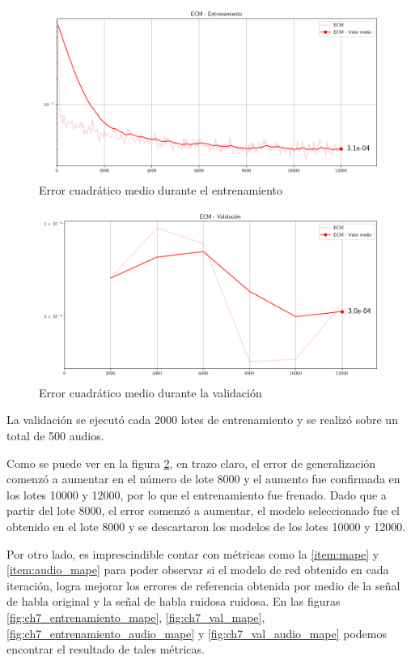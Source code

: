 \begin{figure}
	\centering
	\centerline{\includegraphics[scale=0.65]{images/ch7/entrenamiento/train_mse.png}}
	\caption{Error cuadrático medio durante el entrenamiento}
	\label{fig:ch7_entrenamiento_mse}
\end{figure}

\begin{figure}
	\centering
	\centerline{\includegraphics[scale=0.65]{images/ch7/entrenamiento/val_mse.png}}
	\caption{Error cuadrático medio durante la validación}
	\label{fig:ch7_validacion_mse}
\end{figure}

La validación se ejecutó cada 2000 lotes de entrenamiento y se realizó sobre un total de 500 audios.

Como se puede ver en la figura \ref{fig:ch7_validacion_mse}, en trazo claro, el error de generalización comenzó a aumentar en el número de lote 8000 y el aumento fue confirmada en los lotes 10000 y 12000, por lo que el entrenamiento fue frenado. Dado que a partir del lote 8000, el error comenzó a aumentar, el modelo seleccionado fue el obtenido en el lote 8000 y se descartaron los modelos de los lotes 10000 y 12000.

Por otro lado, es imprescindible contar con métricas como la \ref{item:mape} y \ref{item:audio_mape} para poder observar si el modelo de red obtenido en cada iteración, logra mejorar los errores de referencia obtenida por medio de la señal de habla original y la señal de habla ruidosa ruidosa. En las figuras \ref{fig:ch7_entrenamiento_mape}, \ref{fig:ch7_val_mape}, \ref{fig:ch7_entrenamiento_audio_mape} y \ref{fig:ch7_val_audio_mape} podemos encontrar el resultado de tales métricas.

